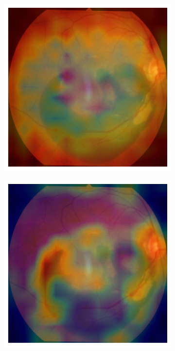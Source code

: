\documentclass[twocolumn, fontsize=10pt]{article}
\begin{document}
\begin{appendices}
\begin{figure}[H]
\begin{subfigure}[b]{0.2\textwidth}
    \end{subfigure}
    \hspace{5mm}
    \begin{subfigure}[b]{0.2\textwidth}
        \centering
        \includegraphics[width=\textwidth]{cbam-heatmap-2.png}
    \end{subfigure}
    \hspace{5mm}
    \begin{subfigure}[b]{0.2\textwidth}
        \raggedright
        \includegraphics[width=\textwidth]{cabnet-heatmap-2.png}

\end{subfigure}
\end{figure}
\end{appendices}
\end{document}
